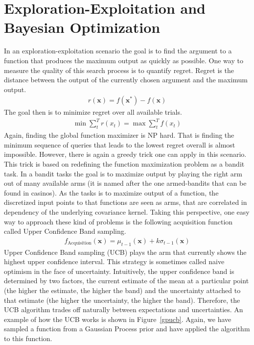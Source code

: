 \documentclass[authoryear,11pt,review]{elsarticle}
\begin{document}
\section{Exploration-Exploitation and Bayesian Optimization}
In an exploration-exploitation scenario the goal is to find the argument to a function that produces the maximum output as quickly as possible. One way to measure the quality of this search process is to quantify regret. Regret is the distance between the output of the currently chosen argument and the maximum output.
\begin{align}
r(\mathbf{x})=f(\mathbf{x}^*)-f(\mathbf{x})
\end{align}
The goal then is to minimize regret over all available trials.
\begin{align}
\min \sum_{t}^{T}r(x_t)=\max\sum_{t}^{T}f(x_t)
\end{align}
Again, finding the global function maximizer is NP hard. That is finding the minimum sequence of queries that leads to the lowest regret overall is almost impossible. However, there is again a greedy trick one can apply in this scenario. This trick is based on redefining the function maximization problem as a bandit task. In a bandit tasks the goal is to maximize output by playing the right arm out of many available arms (it is named after the one armed-bandits that can be found in casinos). As the tasks is to maximize output of a function, the discretized input points to that functions are seen as arms, that are correlated in dependency of the underlying covariance kernel. Taking this perspective, one easy way to approach these kind of problems is the following acquisition function called Upper Confidence Band sampling.
\begin{align}
f_{\text{Acquisition}}(\mathbf{x})=\mu_{t-1}(\mathbf{x})+k\sigma_{t-1}(\mathbf{x})
\end{align}
Upper Confidence Band sampling (UCB) plays the arm that currently shows the highest upper confidence interval. This strategy is sometimes called naive optimism in the face of uncertainty. Intuitively, the upper confidence band is determined by two factors, the current estimate of the mean at a particular point (the higher the estimate, the higher the band) and the uncertainty attached to that estimate (the higher the uncertainty, the higher the band). Therefore, the UCB algorithm trades off naturally between expectations and uncertainties. An example of how the UCB works is shown in Figure~\ref{gpucb}. Again, we have sampled a function from a Gaussian Process prior and have applied the algorithm to this function.
\end{document}
